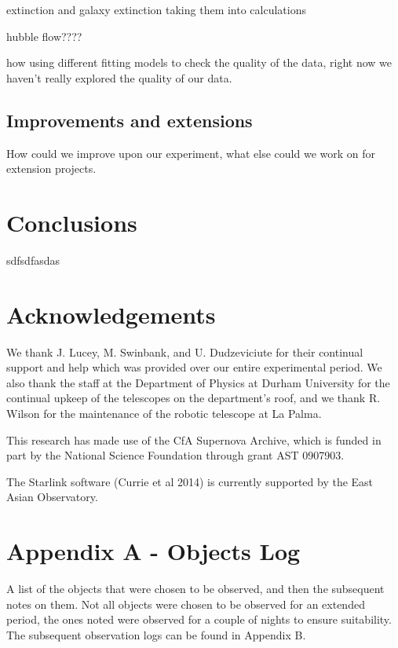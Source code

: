 \documentclass[twocolumn]{revtex4}
\begin{document}
extinction and galaxy extinction taking them into calculations

hubble flow????

how using different fitting models to check the quality of the data, right now we haven't really explored the quality of our data. 

\subsection{Improvements and extensions}
How could we improve upon our experiment, what else could we work on for extension projects.

\vspace{-5ex}
\section{Conclusions}
\label{conclusions}
\vspace{-2ex}

sdfsdfasdas

\vspace{-5ex}
\section*{Acknowledgements}
\vspace{-2ex}
We thank J. Lucey, M. Swinbank, and U. Dudzeviciute for their continual support and help which was provided over our entire experimental period. We also thank the staff at the Department of Physics at Durham University for the continual upkeep of the telescopes on the department's roof, and we thank R. Wilson for the maintenance of the robotic telescope at La Palma.

This research has made use of the CfA Supernova Archive, which is funded in part by the National Science Foundation through grant AST 0907903.

The Starlink software (Currie et al 2014) is currently supported by the East Asian Observatory.




\clearpage
\onecolumngrid
\vspace{-3ex}
\section*{Appendix A - Objects Log} \label{objectslog}
\vspace{-2ex}
A list of the objects that were chosen to be observed, and then the subsequent notes on them. Not all objects were chosen to be observed for an extended period, the ones noted were observed for a couple of nights to ensure suitability. The subsequent observation logs can be found in Appendix B.
\end{document}
